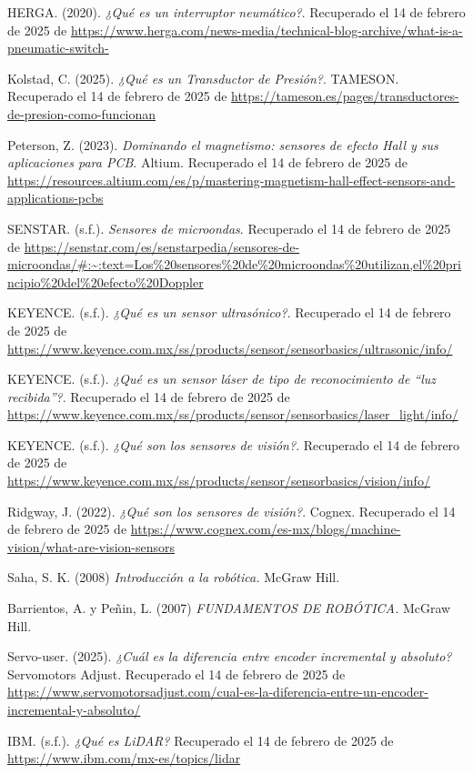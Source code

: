 \begin{thebibliography}{99}
	\vspace{10mm}
	
	HERGA. (2020). 
	\textit{¿Qué es un interruptor neumático?}. Recuperado el 14 de febrero de 2025 de \url{https://www.herga.com/news-media/technical-blog-archive/what-is-a-pneumatic-switch-}
	
	Kolstad, C. (2025). 
	\textit{¿Qué es un Transductor de Presión?}. TAMESON. Recuperado el 14 de febrero de 2025 de \url{https://tameson.es/pages/transductores-de-presion-como-funcionan}
	
	Peterson, Z. (2023). 
	\textit{Dominando el magnetismo: sensores de efecto Hall y sus aplicaciones para PCB}. Altium. Recuperado el 14 de febrero de 2025 de \url{https://resources.altium.com/es/p/mastering-magnetism-hall-effect-sensors-and-applications-pcbs}
	
	SENSTAR. (s.f.). 
	\textit{Sensores de microondas}. Recuperado el 14 de febrero de 2025 de \url{https://senstar.com/es/senstarpedia/sensores-de-microondas/#:~:text=Los%20sensores%20de%20microondas%20utilizan,el%20principio%20del%20efecto%20Doppler}
	
	KEYENCE. (s.f.). 
	\textit{¿Qué es un sensor ultrasónico?}. Recuperado el 14 de febrero de 2025 de \url{https://www.keyence.com.mx/ss/products/sensor/sensorbasics/ultrasonic/info/}
	
	KEYENCE. (s.f.). 
	\textit{¿Qué es un sensor láser de tipo de reconocimiento de “luz recibida”?}. Recuperado el 14 de febrero de 2025 de \url{https://www.keyence.com.mx/ss/products/sensor/sensorbasics/laser_light/info/}
	
	KEYENCE. (s.f.). 
	\textit{¿Qué son los sensores de visión?}. Recuperado el 14 de febrero de 2025 de \url{https://www.keyence.com.mx/ss/products/sensor/sensorbasics/vision/info/}
	
	Ridgway, J. (2022). 
	\textit{¿Qué son los sensores de visión?}. Cognex. Recuperado el 14 de febrero de 2025 de \url{https://www.cognex.com/es-mx/blogs/machine-vision/what-are-vision-sensors}
	
	Saha, S. K. (2008)
	\textit{Introducción a la robótica.} McGraw Hill.
	
	Barrientos, A. y Peñin, L. (2007) 
	\textit{FUNDAMENTOS DE ROBÓTICA.} McGraw Hill.
	
	Servo-user. (2025). 
	\textit{¿Cuál es la diferencia entre encoder incremental y absoluto?}Servomotors Adjust. Recuperado el 14 de febrero de 2025 de \url{https://www.servomotorsadjust.com/cual-es-la-diferencia-entre-un-encoder-incremental-y-absoluto/}

	IBM. (s.f.). 
	\textit{¿Qué es LiDAR?}  Recuperado el 14 de febrero de 2025 de \url{https://www.ibm.com/mx-es/topics/lidar}
	
	
\end{thebibliography}


